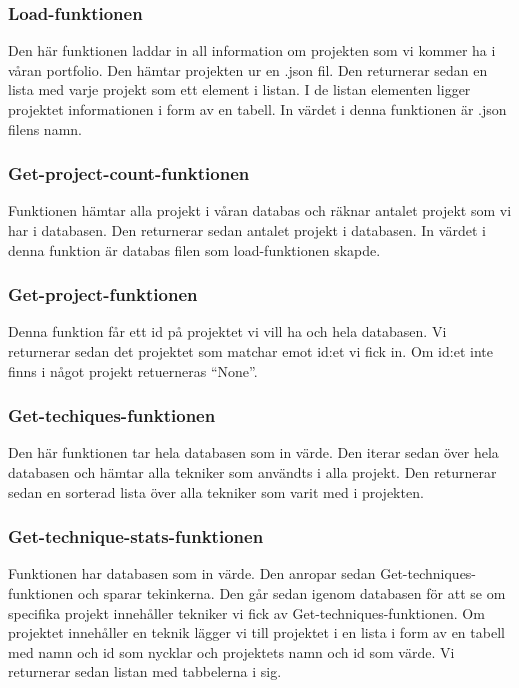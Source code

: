 \documentclass{TDP003mall}
\begin{document}
\subsubsection{Load-funktionen}
\label{over-load-func}
Den här funktionen laddar in all information om projekten som vi kommer ha i våran portfolio. Den hämtar projekten ur en .json fil. Den returnerar sedan en lista med varje projekt som ett element i listan. I de listan elementen ligger projektet informationen i form av en tabell. In värdet i denna funktionen är .json filens namn.

\subsubsection{Get-project-count-funktionen}
\label{over-get-proj-cou-func}
Funktionen hämtar alla projekt i våran databas och räknar antalet projekt som vi har i databasen. Den returnerar sedan antalet projekt i databasen. In värdet i denna funktion är databas filen som load-funktionen skapde.

\subsubsection{Get-project-funktionen}
\label{over-get-proj-func}
Denna funktion får ett id på projektet vi vill ha och hela databasen. Vi returnerar sedan det projektet som matchar emot id:et vi fick in. Om id:et inte finns i något projekt retuerneras ``None''. 

\subsubsection{Get-techiques-funktionen}
\label{over-get-techs-func}
Den här funktionen tar hela databasen som in värde. Den iterar sedan över hela databasen och hämtar alla tekniker som användts i alla projekt. Den returnerar sedan en sorterad lista över alla tekniker som varit med i projekten.

\subsubsection{Get-technique-stats-funktionen}
\label{over-get-tech-stats-func}
Funktionen har databasen som in värde. Den anropar sedan Get-techniques-funktionen och sparar tekinkerna. Den går sedan igenom databasen för att se om specifika projekt innehåller tekniker vi fick av Get-techniques-funktionen. Om projektet innehåller en teknik lägger vi till projektet i en lista i form av en tabell med namn och id som nycklar och projektets namn och id som värde. Vi returnerar sedan listan med tabbelerna i sig.
\end{document}
